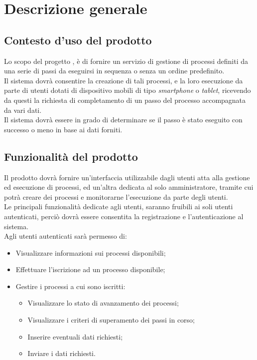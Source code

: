 \section{Descrizione generale}

\subsection{Contesto d'uso del prodotto}
Lo scopo del progetto \progetto{}, è di fornire un servizio di gestione di processi definiti da una serie di passi da eseguirsi in sequenza o senza un ordine predefinito.\\
Il sistema dovrà consentire la creazione di tali processi, e la loro esecuzione da parte di utenti dotati di dispositivo mobili di tipo \textit{smartphone} o \textit{tablet}, ricevendo da questi la richiesta di completamento di un passo del processo accompagnata da vari dati.\\
Il sistema dovrà essere in grado di determinare se il passo è stato eseguito con successo o meno in base ai dati forniti.

\subsection{Funzionalità del prodotto}
Il prodotto dovrà fornire un'interfaccia utilizzabile dagli utenti atta alla gestione ed esecuzione di processi, ed un'altra dedicata al solo amministratore, tramite cui potrà creare dei processi e monitorarne l'esecuzione da parte degli utenti.\\
Le principali funzionalità dedicate agli utenti, saranno fruibili ai soli utenti autenticati, perciò dovrà essere consentita la registrazione e l'autenticazione al sistema.\\
Agli utenti autenticati sarà permesso di:

\begin{itemize}
\item Visualizzare informazioni sui processi disponibili;
\item Effettuare l'iscrizione ad un processo disponibile;
\item Gestire i processi a cui sono iscritti:
\begin{itemize}
\item Visualizzare lo stato di avanzamento dei processi;
\item Visualizzare i criteri di superamento dei passi in corso;
\item Inserire eventuali dati richiesti;
\item Inviare i dati richiesti.
\end{itemize}
\end{itemize}

